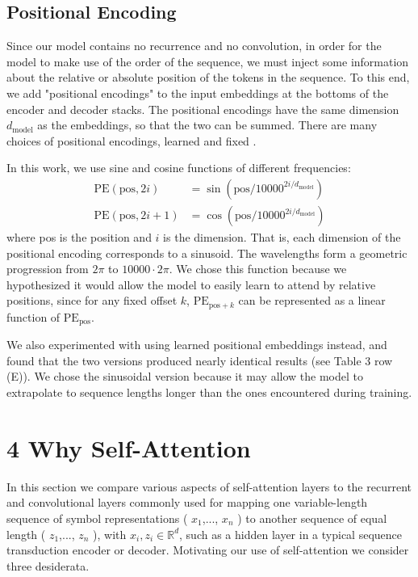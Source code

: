 \documentclass[12pt, a4paper]{article}
\begin{document}
\subsection{Positional Encoding}

Since our model contains no recurrence and no convolution, in order for the model to make use of the order of the sequence, we must inject some information about the relative or absolute position of the tokens in the sequence. To this end, we add "positional encodings" to the input embeddings at the bottoms of the encoder and decoder stacks. The positional encodings have the same dimension $d_{\text{model}}$ as the embeddings, so that the two can be summed. There are many choices of positional encodings, learned and fixed \cite{9}.

In this work, we use sine and cosine functions of different frequencies:
\begin{align*}
\text{PE} ( \text{pos}, 2 i ) &= \sin \left( \text{pos}/ 10000^{2 i/d_{\text{model}}} \right) \\
\text{PE} ( \text{pos}, 2 i +1) &= \cos \left( \text{pos}/ 10000^{2 i/d_{\text{model}}} \right)
\end{align*}
where pos is the position and $i$ is the dimension. That is, each dimension of the positional encoding corresponds to a sinusoid. The wavelengths form a geometric progression from $2 \pi$ to $10000 \cdot 2 \pi$. We chose this function because we hypothesized it would allow the model to easily learn to attend by relative positions, since for any fixed offset $k$, $\text{PE}_{\text{pos} + k}$ can be represented as a linear function of $\text{PE}_{\text{pos}}$.

We also experimented with using learned positional embeddings \cite{9} instead, and found that the two versions produced nearly identical results (see Table 3 row (E)). We chose the sinusoidal version because it may allow the model to extrapolate to sequence lengths longer than the ones encountered during training.

\section{4 Why Self-Attention}

In this section we compare various aspects of self-attention layers to the recurrent and convolutional layers commonly used for mapping one variable-length sequence of symbol representations ( $x_1$,..., $x_n$ ) to another sequence of equal length ( $z_1$,..., $z_n$ ), with $x_i, z_i \in \mathbb{R}^d$, such as a hidden layer in a typical sequence transduction encoder or decoder. Motivating our use of self-attention we consider three desiderata.
\end{document}

